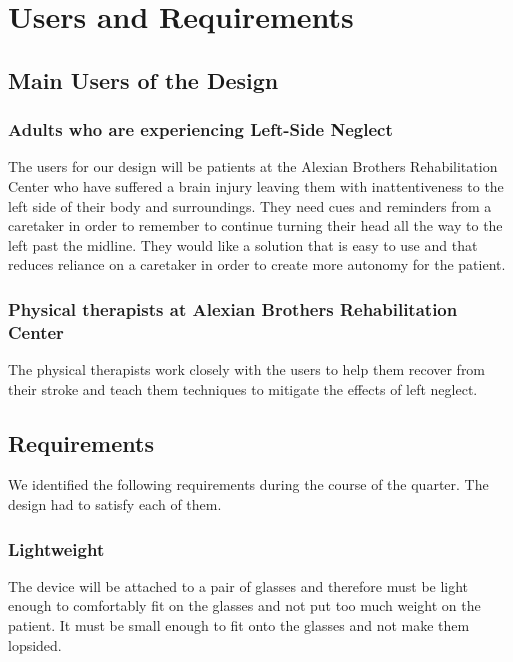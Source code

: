 \chapter{Users and Requirements}
\label{chap:users}

\section{Main Users of the Design}

\subsection{Adults who are experiencing Left-Side Neglect}

The users for our design will be patients at the Alexian Brothers Rehabilitation
Center who have suffered a brain injury leaving them with inattentiveness to the
left side of their body and surroundings. They need cues and reminders from a
caretaker in order to remember to continue turning their head all the way to the
left past the midline. They would like a solution that is easy to use and that
reduces reliance on a caretaker in order to create more autonomy for the
patient.

\subsection{Physical therapists at Alexian Brothers Rehabilitation Center}

The physical therapists work closely with the users to help them recover from
their stroke and teach them techniques to mitigate the effects of left
neglect. 

\section{Requirements}

We identified the following requirements during the course of the quarter. The
design had to satisfy each of them. 

\subsection{Lightweight}

The device will be attached to a pair of glasses and therefore must be light
enough to comfortably fit on the glasses and not put too much weight on the
patient. It must be small enough to fit onto the glasses and not make them
lopsided.

